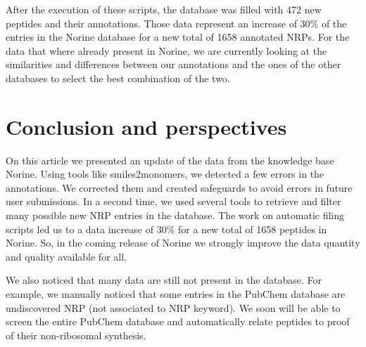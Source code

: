 \documentclass[long, final]{jobim2017}
\begin{document}
After the execution of these scripts, the database was filled with 472 new peptides and their annotations.
Those data represent an increase of 30\% of the entries in the Norine database for a new total of 1658 annotated NRPs.
For the data that where already present in Norine, we are currently looking at the similarities and differences between our annotations and the ones of the other databases to select the best combination of the two.


\section{Conclusion and perspectives}

On this article we presented an update of the data from the knowledge base Norine.
Using tools like smiles2monomers, we detected a few errors in the annotations.
We corrected them and created safeguards to avoid errors in future user submissions.
In a second time, we used several tools to retrieve and filter many possible new NRP entries in the database.
The work on automatic filing scripts led us to a data increase of 30\% for a new total of 1658 peptides in Norine.
So, in the coming release of Norine we strongly improve the data quantity and quality available for all.

We also noticed that many data are still not present in the database.
For example, we manually noticed that some entries in the PubChem database are undiscovered NRP (not associated to NRP keyword).
We soon will be able to screen the entire PubChem database and automatically relate peptides to proof of their non-ribosomal synthesis.



 
 
\end{document}
